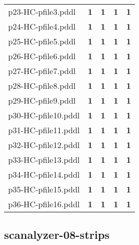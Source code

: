 \documentclass{article}
\begin{document}
\begin{tabular}{@{}lrrrr@{}}
p23-HC-pfile3.pddl & \textbf{1} & \textbf{1} & \textbf{1} & \textbf{1} \\
p24-HC-pfile4.pddl & \textbf{1} & \textbf{1} & \textbf{1} & \textbf{1} \\
p25-HC-pfile5.pddl & \textbf{1} & \textbf{1} & \textbf{1} & \textbf{1} \\
p26-HC-pfile6.pddl & \textbf{1} & \textbf{1} & \textbf{1} & \textbf{1} \\
p27-HC-pfile7.pddl & \textbf{1} & \textbf{1} & \textbf{1} & \textbf{1} \\
p28-HC-pfile8.pddl & \textbf{1} & \textbf{1} & \textbf{1} & \textbf{1} \\
p29-HC-pfile9.pddl & \textbf{1} & \textbf{1} & \textbf{1} & \textbf{1} \\
p30-HC-pfile10.pddl & \textbf{1} & \textbf{1} & \textbf{1} & \textbf{1} \\
p31-HC-pfile11.pddl & \textbf{1} & \textbf{1} & \textbf{1} & \textbf{1} \\
p32-HC-pfile12.pddl & \textbf{1} & \textbf{1} & \textbf{1} & \textbf{1} \\
p33-HC-pfile13.pddl & \textbf{1} & \textbf{1} & \textbf{1} & \textbf{1} \\
p34-HC-pfile14.pddl & \textbf{1} & \textbf{1} & \textbf{1} & \textbf{1} \\
p35-HC-pfile15.pddl & \textbf{1} & \textbf{1} & \textbf{1} & \textbf{1} \\
p36-HC-pfile16.pddl & \textbf{1} & \textbf{1} & \textbf{1} & \textbf{1} \\
\end{tabular}

\hypertarget{coverage-scanalyzer-08-strips}{}
\subsection*{scanalyzer-08-strips}
\end{document}
